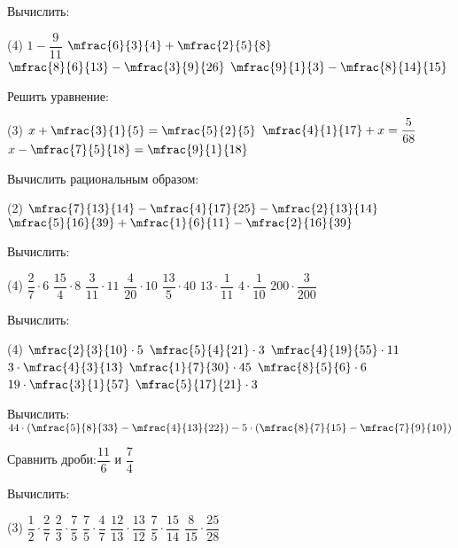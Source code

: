 \begin{homework}[number=1]
	\begin{listofex}
		\item Вычислить:
		\begin{tasks}(4)
			\task \( 1-\dfrac{9}{11} \)
			\task \( \mfrac{6}{3}{4}+\mfrac{2}{5}{8} \)
			\task \( \mfrac{8}{6}{13}-\mfrac{3}{9}{26} \)
			\task \( \mfrac{9}{1}{3}-\mfrac{8}{14}{15} \)
		\end{tasks}
		\item Решить уравнение:
		\begin{tasks}(3)
			\task \( x+\mfrac{3}{1}{5}=\mfrac{5}{2}{5} \)
			\task \( \mfrac{4}{1}{17}+x=\dfrac{5}{68} \)
			\task \( x-\mfrac{7}{5}{18}=\mfrac{9}{1}{18} \)
		\end{tasks}
		\item Вычислить рациональным образом:
		\begin{tasks}(2)
			\task \( \mfrac{7}{13}{14}-\mfrac{4}{17}{25}-\mfrac{2}{13}{14} \)
			\task \( \mfrac{5}{16}{39}+\mfrac{1}{6}{11}-\mfrac{2}{16}{39} \)
		\end{tasks}
		\item Вычислить:
		\begin{tasks}(4)
			\task \( \dfrac{2}{7}\cdot6 \)
			\task \( \dfrac{15}{4}\cdot8 \)
			\task \( \dfrac{3}{11}\cdot11 \)
			\task \( \dfrac{4}{20}\cdot10 \)
			\task \( \dfrac{13}{5}\cdot40 \)
			\task \( 13\cdot\dfrac{1}{11} \)
			\task \( 4\cdot\dfrac{1}{10} \)
			\task \( 200\cdot\dfrac{3}{200} \)
		\end{tasks}
		\item Вычислить:
		\begin{tasks}(4)
			\task \( \mfrac{2}{3}{10}\cdot5 \)
			\task \( \mfrac{5}{4}{21}\cdot3 \)
			\task \( \mfrac{4}{19}{55}\cdot11 \)
			\task \( 3\cdot\mfrac{4}{3}{13} \)
			\task \( \mfrac{1}{7}{30}\cdot45 \)
			\task \( \mfrac{8}{5}{6}\cdot6 \)
			\task \( 19\cdot\mfrac{3}{1}{57} \)
			\task \( \mfrac{5}{17}{21}\cdot3 \)
		\end{tasks}
		\item Вычислить:\quad\( 44\cdot\left( \mfrac{5}{8}{33}-\mfrac{4}{13}{22} \right)-5\cdot\left( \mfrac{8}{7}{15}-\mfrac{7}{9}{10} \right) \)
		\item Сравнить дроби:\quad\( \dfrac{11}{6} \) и \( \dfrac{7}{4} \)
		\item Вычислить:
		\begin{tasks}(3)
			\task \( \dfrac{1}{2}\cdot\dfrac{2}{7} \)
			\task \( \dfrac{2}{3}\cdot\dfrac{7}{5} \)
			\task \( \dfrac{7}{5}\cdot\dfrac{4}{7} \)
			\task \( \dfrac{12}{13}\cdot\dfrac{13}{12} \)
			\task \( \dfrac{7}{5}\cdot\dfrac{15}{14} \)
			\task \( \dfrac{8}{15}\cdot\dfrac{25}{28} \)
		\end{tasks}
	\end{listofex}
\end{homework}

